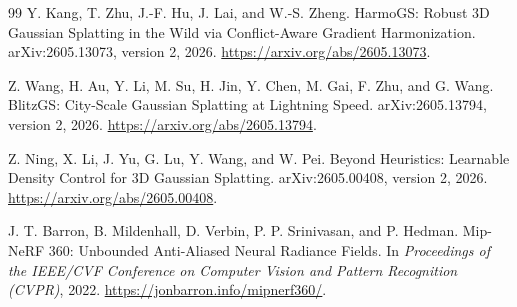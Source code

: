 \documentclass[10pt]{article}
\begin{document}
\begin{thebibliography}{99}
Y. Kang, T. Zhu, J.-F. Hu, J. Lai, and W.-S. Zheng.
\newblock HarmoGS: Robust 3D Gaussian Splatting in the Wild via
Conflict-Aware Gradient Harmonization.
\newblock arXiv:2605.13073, version 2, 2026.
\newblock \url{https://arxiv.org/abs/2605.13073}.

Z. Wang, H. Au, Y. Li, M. Su, H. Jin, Y. Chen, M. Gai, F. Zhu, and G. Wang.
\newblock BlitzGS: City-Scale Gaussian Splatting at Lightning Speed.
\newblock arXiv:2605.13794, version 2, 2026.
\newblock \url{https://arxiv.org/abs/2605.13794}.

Z. Ning, X. Li, J. Yu, G. Lu, Y. Wang, and W. Pei.
\newblock Beyond Heuristics: Learnable Density Control for 3D Gaussian
Splatting.
\newblock arXiv:2605.00408, version 2, 2026.
\newblock \url{https://arxiv.org/abs/2605.00408}.

J. T. Barron, B. Mildenhall, D. Verbin, P. P. Srinivasan, and P. Hedman.
\newblock Mip-NeRF 360: Unbounded Anti-Aliased Neural Radiance Fields.
\newblock In \emph{Proceedings of the IEEE/CVF Conference on Computer Vision
and Pattern Recognition (CVPR)}, 2022.
\newblock \url{https://jonbarron.info/mipnerf360/}.

\end{thebibliography}
\end{document}
